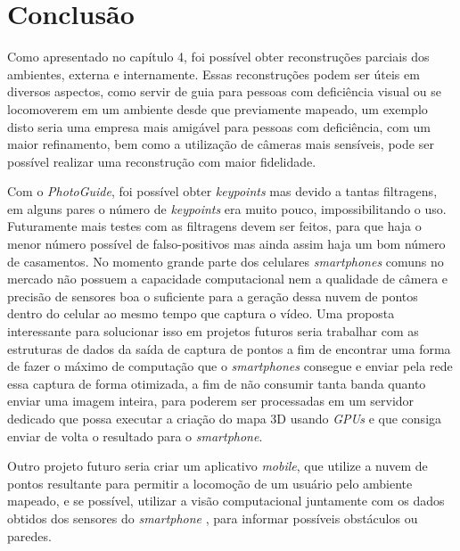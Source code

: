 \chapter{Conclusão}
Como apresentado no capítulo 4, foi possível obter reconstruções parciais dos ambientes, externa e internamente. Essas reconstruções podem ser úteis em diversos aspectos, como servir de guia para pessoas com deficiência visual ou se locomoverem em um ambiente desde que previamente mapeado, um exemplo disto seria uma empresa mais amigável para pessoas com deficiência, com um maior refinamento, bem como a utilização de câmeras mais sensíveis, pode ser possível realizar uma reconstrução com maior fidelidade. 

 Com o \textit{PhotoGuide}, foi possível obter \textit{keypoints} mas devido a tantas filtragens, em alguns pares o número de \textit{keypoints} era muito pouco, impossibilitando o uso. Futuramente mais testes com as filtragens devem ser feitos, para que haja o menor número possível de falso-positivos mas ainda assim haja um bom número de casamentos. No momento grande parte dos celulares \textit{smartphones} comuns no mercado não possuem a capacidade computacional nem a qualidade de câmera e precisão de sensores boa o suficiente para a geração dessa nuvem de pontos dentro do celular ao mesmo tempo que captura o vídeo. Uma proposta interessante para solucionar isso em projetos futuros seria trabalhar com as estruturas de dados da saída de captura de pontos a fim de encontrar uma forma de fazer o máximo de computação que o \textit{smartphones} consegue e enviar pela rede essa captura de forma otimizada, a fim de não consumir tanta banda quanto enviar uma imagem inteira, para poderem ser processadas em um servidor dedicado que possa executar a criação do mapa 3D usando \textit{GPUs} e que consiga enviar de volta o resultado para o \textit{smartphone}.
	
Outro projeto futuro seria criar um aplicativo \textit{mobile}, que utilize a nuvem de pontos resultante para permitir a locomoção de um usuário pelo ambiente mapeado, e se possível, utilizar a visão computacional juntamente com os dados obtidos dos sensores do \textit{smartphone} , para informar possíveis obstáculos ou paredes.
